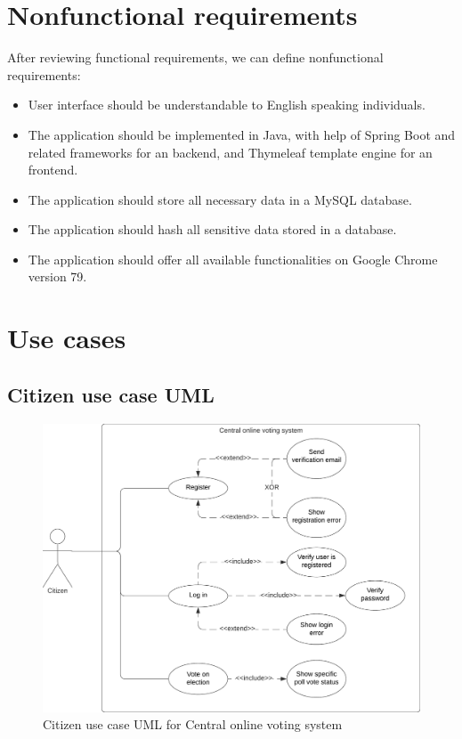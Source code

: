 \documentclass[a4paper,twoside,12pt]{book}
\newcommand{\Title}{Central online voting system}
\begin{document}
  \section{Nonfunctional requirements}
    After reviewing functional requirements, we can define nonfunctional requirements:
    \begin{itemize}
      \item User interface should be understandable to English speaking individuals.
      \item The application should be implemented in Java, with help of Spring Boot and related frameworks for an backend, 
      and Thymeleaf template engine for an frontend.
      \item The application should store all necessary data in a MySQL database.
      \item The application should hash all sensitive data stored in a database. %
      \item The application should offer all available functionalities on Google Chrome version 79.
    \end{itemize}
  \pagebreak

  \section{Use cases}
    \subsection{Citizen use case UML}
    \begin{figure}[h]
      \includegraphics[width=\linewidth]{citizen_uml.png}
      \caption{Citizen use case UML for \Title}
      \label{fig:citizen_uml}
    \end{figure}
\end{document}
